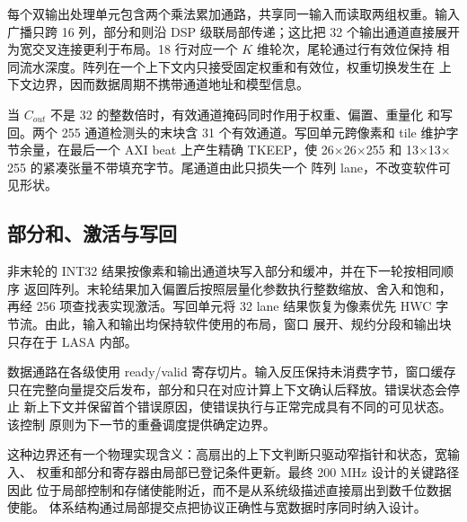 每个双输出处理单元包含两个乘法累加通路，共享同一输入而读取两组权重。输入
广播只跨 16 列，部分和则沿 DSP 级联局部传递；这比把 32 个输出通道直接展开
为宽交叉连接更利于布局。18 行对应一个 $K$ 维轮次，尾轮通过行有效位保持
相同流水深度。阵列在一个上下文内只接受固定权重和有效位，权重切换发生在
上下文边界，因而数据周期不携带通道地址和模型信息。

当 $C_{out}$ 不是 32 的整数倍时，有效通道掩码同时作用于权重、偏置、重量化
和写回。两个 255 通道检测头的末块含 31 个有效通道。写回单元跨像素和 tile
维护字节余量，在最后一个 AXI beat 上产生精确 TKEEP，使 26$\times$26$\times$255
和 13$\times$13$\times$255 的紧凑张量不带填充字节。尾通道由此只损失一个
阵列 lane，不改变软件可见形状。

\subsection{部分和、激活与写回}

非末轮的 INT32 结果按像素和输出通道块写入部分和缓冲，并在下一轮按相同顺序
返回阵列。末轮结果加入偏置后按照层量化参数执行整数缩放、舍入和饱和，再经
256 项查找表实现激活\cite{jacob2018quant,leakyrelu2015}。写回单元将 32 lane
结果恢复为像素优先 HWC 字节流。由此，输入和输出均保持软件使用的布局，窗口
展开、规约分段和输出块只存在于 LASA 内部。

数据通路在各级使用 ready/valid 寄存切片。输入反压保持未消费字节，窗口缓存
只在完整向量提交后发布，部分和只在对应计算上下文确认后释放。错误状态会停止
新上下文并保留首个错误原因，使错误执行与正常完成具有不同的可见状态。该控制
原则为下一节的重叠调度提供确定边界。

这种边界还有一个物理实现含义：高扇出的上下文判断只驱动窄指针和状态，宽输入、
权重和部分和寄存器由局部已登记条件更新。最终 200 MHz 设计的关键路径因此
位于局部控制和存储使能附近，而不是从系统级描述直接扇出到数千位数据使能。
体系结构通过局部提交点把协议正确性与宽数据时序同时纳入设计。
